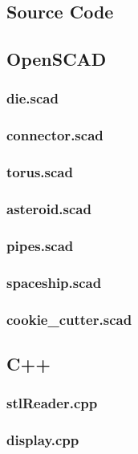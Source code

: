 \documentclass[12pt]{article}
\begin{document}
\begin{onehalfspace}
\section{Source Code}
\subsection{OpenSCAD}
\subsubsection{die.scad}
% 
\subsubsection{connector.scad}
%
\subsubsection{torus.scad}

\subsubsection{asteroid.scad}

\subsubsection{pipes.scad}

\subsubsection{spaceship.scad}

\subsubsection{cookie\_cutter.scad}


\subsection{C++}
\subsubsection{stlReader.cpp}

\subsubsection{display.cpp}


\end{onehalfspace}
\end{document}
